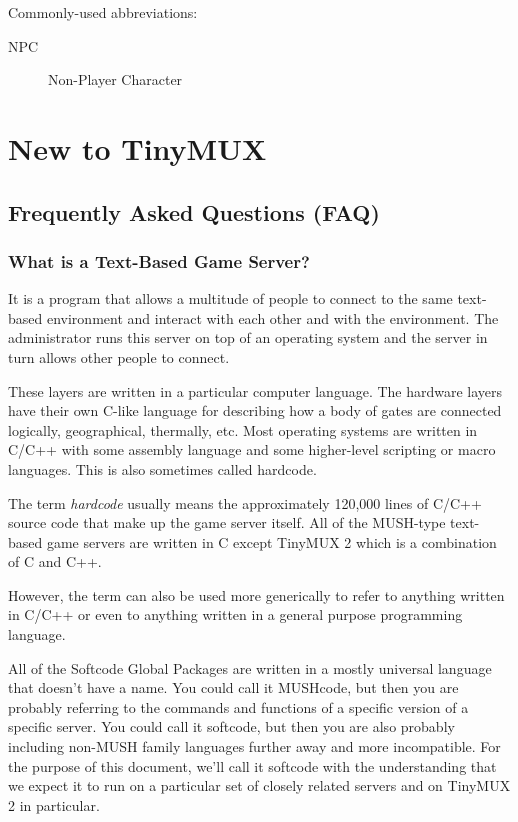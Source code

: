 \documentclass[10pt,letterpaper]{book}
\begin{document}
Commonly-used abbreviations:

\begin{description}
\item[NPC] Non-Player Character

\end{description}

\chapter{New to TinyMUX}
\section{Frequently Asked Questions (FAQ)}
\subsection{What is a Text-Based Game Server?}
It is a program that allows a multitude of people to connect to the same
text-based environment and interact with each other and with the environment.
The administrator runs this server on top of an operating system and the server
in turn allows other people to connect. %

These layers are written in a particular computer language. The hardware
layers have their own C-like language for describing how a body of gates are
connected logically, geographical, thermally, etc.  Most operating systems are
written in C/C++ with some assembly language and some higher-level scripting
or macro languages. This is also sometimes called hardcode.

The term \emph{hardcode} usually means the approximately 120,000 lines of C/C++
source code that make up the game server itself.
All of the MUSH-type text-based game servers are written in C except
TinyMUX 2 which is a combination of C and C++.

However, the term can also be used more generically to refer to anything
written in C/C++ or even to anything written in a general purpose programming
language.

All of the Softcode Global Packages are written in a mostly universal language
that doesn't have a name. You could call it MUSHcode, but then you are probably
referring to the commands and functions of a specific version of a specific
server. You could call
it softcode, but then you are also probably including non-MUSH family languages
further away and more incompatible. For the purpose of this document, we'll
call it softcode with the understanding that we expect it to run on a particular
set of closely related servers and on TinyMUX 2 in particular.
\end{document}
